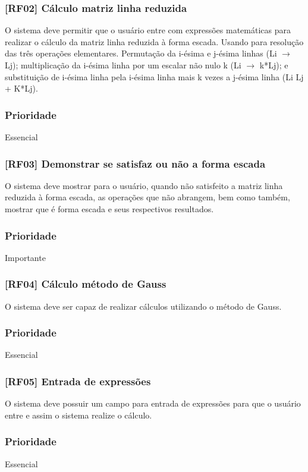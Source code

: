 \documentclass{scrreprt}
\begin{document}
\subsubsection{[RF02] Cálculo matriz linha reduzida}
O sistema deve permitir que o usuário entre com expressões matemáticas para realizar o cálculo da matriz linha reduzida à forma escada. Usando para resolução das três operações elementares. Permutação da i-ésima e j-ésima linhas (Li $\rightarrow$ Lj); multiplicação da i-ésima linha por um escalar não nulo k (Li $\rightarrow$ k*Lj); e substituição de i-ésima linha pela i-ésima linha mais k vezes a j-ésima linha (Li \rightarrow Lj + K*Lj).
\subsubsection{Prioridade}
Essencial

\subsubsection{[RF03] Demonstrar se satisfaz ou não a forma escada}
O sistema deve mostrar para o usuário, quando não satisfeito a matriz linha reduzida à forma escada, as operações que não abrangem, bem como também, mostrar que é forma escada e seus respectivos resultados.
\subsubsection{Prioridade}
Importante

\subsubsection{[RF04] Cálculo método de Gauss}
O sistema deve ser capaz de realizar cálculos utilizando o método de Gauss.
\subsubsection{Prioridade}
Essencial

\subsubsection{[RF05] Entrada de expressões}
O sistema deve possuir um campo para entrada de expressões para que o usuário entre e assim o sistema realize o cálculo.
\subsubsection{Prioridade}
Essencial
\end{document}
